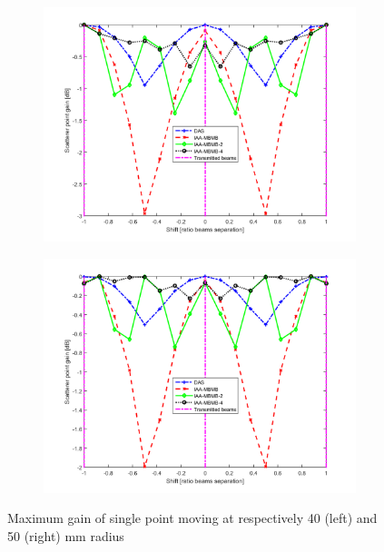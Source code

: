 \begin{figure}[ht]
    \centering
    \begin{subfigure}[t]{0.48\linewidth}
        \includegraphics[width=\linewidth]{./images/discussion/loss_vs_shift_upsampled.png}
    \end{subfigure}
    \quad
    \begin{subfigure}[t]{0.48\linewidth}
        \includegraphics[width=\linewidth]{./images/discussion/loss_vs_shift_50mm_upsampled.png}
    \end{subfigure}
	\caption{Maximum gain of single point moving at respectively 40 (left) and 50 (right) mm radius}
	\label{fig:loss_vs_shift_upsampled}
\end{figure}

